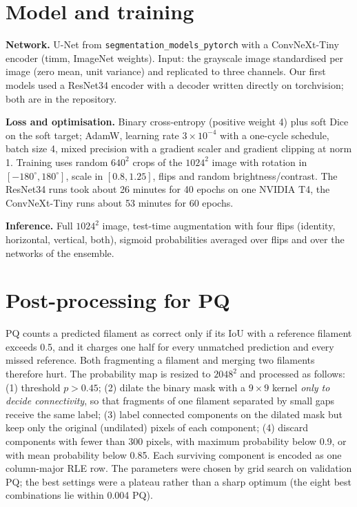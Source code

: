 \documentclass[10pt]{article}
\begin{document}
\section{Model and training}
\textbf{Network.} U-Net from \texttt{segmentation\_models\_pytorch} with a ConvNeXt-Tiny encoder (timm, ImageNet weights).
Input: the grayscale image standardised per image (zero mean, unit variance) and replicated to three channels. Our
first models used a ResNet34 encoder with a decoder written directly on torchvision; both are in the repository.

\textbf{Loss and optimisation.} Binary cross-entropy (positive weight 4) plus soft Dice on the soft target; AdamW,
learning rate $3\!\times\!10^{-4}$ with a one-cycle schedule, batch size 4, mixed precision with a gradient scaler and
gradient clipping at norm 1. Training uses random $640^2$ crops of the $1024^2$ image with rotation in
$[-180^\circ,180^\circ]$, scale in $[0.8,1.25]$, flips and random brightness/contrast. The ResNet34 runs took about 26
minutes for 40 epochs on one NVIDIA T4, the ConvNeXt-Tiny runs about 53 minutes for 60 epochs.

\textbf{Inference.} Full $1024^2$ image, test-time augmentation with four flips (identity, horizontal, vertical,
both), sigmoid probabilities averaged over flips and over the networks of the ensemble.

\section{Post-processing for PQ}
PQ counts a predicted filament as correct only if its IoU with a reference filament exceeds 0.5, and it charges one half
for every unmatched prediction and every missed reference. Both fragmenting a filament and merging two filaments therefore
hurt. The probability map is resized to $2048^2$ and processed as follows:
(1) threshold $p>0.45$; (2) dilate the binary mask with a $9\times9$ kernel \emph{only to decide connectivity}, so that
fragments of one filament separated by small gaps receive the same label; (3) label connected components on the dilated
mask but keep only the original (undilated) pixels of each component; (4) discard components with fewer than 300 pixels,
with maximum probability below 0.9, or with mean probability below 0.85. Each surviving component is encoded as one
column-major RLE row. The parameters were chosen by grid search on validation PQ; the best settings were a plateau
rather than a sharp optimum (the eight best combinations lie within 0.004 PQ).
\end{document}
